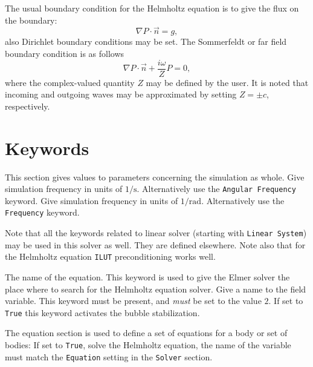 \begin{versiona}
The usual boundary condition for the Helmholtz equation is to
give the flux on the boundary:
\begin{equation}
\nabla P\cdot\Vec{n} = g,
\end{equation}
also Dirichlet boundary conditions may be set.
The Sommerfeldt or far field boundary condition is as follows
\begin{equation}\label{Sommerfeldt-bc}
\nabla P\cdot\Vec{n} + \frac{i\omega}{Z}P = 0,
\end{equation}
where the complex-valued quantity $Z$ may be defined by the user.
It is noted that incoming and outgoing waves may be approximated by
setting $Z=\pm c$, respectively.



\section{Keywords} 
\end{versiona}

\sifbegin

This section gives values to parameters concerning the simulation
as whole.
\sifbegin
{}
Give simulation frequency in units of $1/\mathrm{s}$.
Alternatively use the {\tt Angular Frequency} keyword.
Give simulation frequency in units of $1/\mathrm{rad}$.
Alternatively use the {\tt Frequency} keyword.
\sifend

Note that all the keywords related to linear solver (starting
with {\tt Linear System})
may be used in this solver as well.  They are defined elsewhere. 
Note also that for the Helmholtz equation {\tt ILUT} preconditioning
works well.

\sifbegin
{} 
The name of the equation.
This keyword is used to give the Elmer solver the place where
to search for the Helmholtz equation solver.
Give a name to the field variable.
This keyword must be present, and {\it must} be set to the value $2$.
If set to {\tt True} this keyword activates the bubble stabilization.
\sifend

The equation section is used to define a set of equations for a body or set of bodies:
\sifbegin
{} If set to {\tt True}, solve the Helmholtz equation,
the name of the variable must match the {\tt Equation} setting in the {\tt Solver} section.
\sifend


